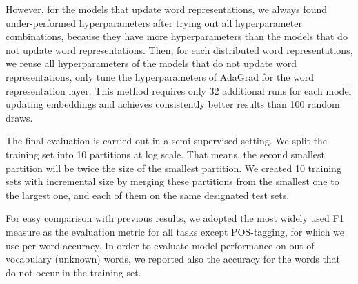 However, for the models that update word representations, we always found under-performed hyperparameters after trying out all hyperparameter combinations, because they have more hyperparameters than the models that do not update word representations. Then, for each distributed word representations, we reuse all hyperparameters of the models that do not update word representations, only tune the hyperparameters of AdaGrad for the word representation layer. This method requires only 32 additional runs for each model updating embeddings and achieves consistently better results than 100 random draws.

The final evaluation is carried out in a semi-supervised setting. We split the training set into 10 partitions at log scale. That means, the second smallest partition will be twice the size of the smallest partition. We created 10 training sets with incremental size by merging these partitions from the smallest one to the largest one, and each of them on the same designated test sets. 

For easy comparison with previous results, we adopted the most widely used F1 measure as the evaluation metric for all tasks except POS-tagging, for which we use per-word accuracy. In order to evaluate model performance on out-of-vocabulary (unknown) words, we reported also the accuracy for the words that do not occur in the training set.



